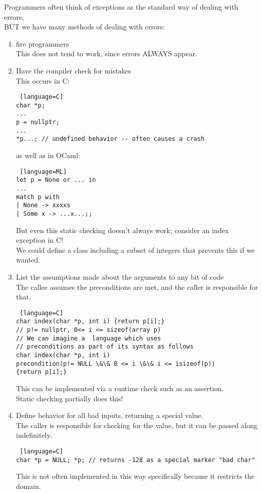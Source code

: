 \documentclass[../../lecture_notes.tex]{subfiles}
\begin{document}
Programmers often think of exceptions as the standard way of dealing with errors,\\
\indent BUT we have many methods of dealing with errors:
\begin{enumerate}
	\item fire programmers\\
		This does not tend to work, since errors ALWAYS appear.
	\item Have the compiler check for mistakes\\
		This occurs in C: 
		\begin{lstlisting} [language=C]
char *p;
...
p = nullptr;
...
*p...; // undefined behavior -- often causes a crash
		\end{lstlisting}
	        as well as in OCaml:
		\begin{lstlisting} [language=ML]
let p = None or ... in
...
match p with
| None -> xxxxs
| Some x -> ...x...;;
		\end{lstlisting}
		But even this static checking doesn’t always work; consider an index exception in C!\\
		We could define a class including a subset of integers that prevents this if we wanted.
	\item List the assumptions made about the arguments to any bit of code\\
		The callee assumes the preconditions are met, and the caller is responsible for that.
		\begin{lstlisting} [language=C]
char index(char *p, int i) {return p[i];}
// p!= nullptr, 0<= i <= sizeof(array p)
// We can imagine a  language which uses 
// preconditions as part of its syntax as follows
char index(char *p, int i)
precondition(p!= NULL \&\& 0 <= i \&\& i <= isizeof(p))
{return p[i];}
		\end{lstlisting}
		This can be implemented via a runtime check such as an assertion.\\
		Static checking partially does this!
	\item Define behavior for all bad inputs, returning a special value.\\
		The caller is responsible for checking for the value, but it can be passed along indefinitely.\\
		\begin{lstlisting} [language=C]
char *p = NULL; *p; // returns -128 as a special marker "bad char"
		\end{lstlisting}
		This is not often implemented in this way specifically because it restricts the domain.\\

\end{enumerate}
\end{document}
